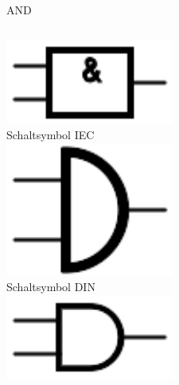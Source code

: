 \begin{frame}{AND}
  \begin{columns}
    \includegraphics[width=\textwidth,height=.2\textheight,keepaspectratio]{a14/AND_IEC.pdf}\\
    {\small Schaltsymbol IEC}\\
    \includegraphics[width=\textwidth,height=.2\textheight,keepaspectratio]{a14/AND_DIN.pdf}\\
    {\small Schaltsymbol DIN}\\
    \includegraphics[width=\textwidth,height=.2\textheight,keepaspectratio]{a14/AND_ANSI.pdf}\\

\end{columns}
\end{frame}
